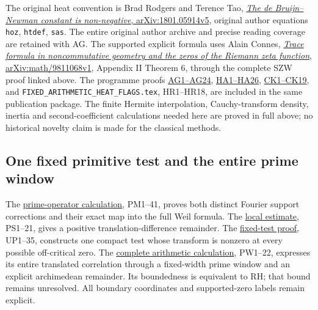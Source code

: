 \documentclass[
  10pt,
  a4paper,
]{article}
\begin{document}
The original heat convention is Brad Rodgers and Terence Tao,
\href{https://arxiv.org/abs/1801.05914v5}{\emph{The de Bruijn--Newman
constant is non-negative}, arXiv:1801.05914v5}, original author
equations \texttt{hoz}, \texttt{htdef}, \texttt{sas}. The entire
original author archive and precise reading coverage are retained with
AG. The supported explicit formula uses Alain Connes,
\href{https://arxiv.org/abs/math/9811068v1}{\emph{Trace formula in
noncommutative geometry and the zeros of the Riemann zeta function},
arXiv:math/9811068v1}, Appendix II Theorem 6, through the complete SZW
proof linked above. The programme proofs
\href{ACTUAL_HEAT_ZERO_DISTRIBUTION_VARIATION.md}{AG1--AG24},
\href{HEAT_CAUCHY_ARITHMETIC_DERIVATION.md}{HA1--HA26},
\href{CAUCHY_WEIL_POSITIVITY_CRITERION.md}{CK1--CK19}, and
\texttt{FIXED\_\allowbreak{}ARITHMETIC\_\allowbreak{}HEAT\_\allowbreak{}FLAGS.\allowbreak{}tex}, HR1--HR18, are included in
the same publication package. The finite Hermite interpolation,
Cauchy-transform density, inertia and second-coefficient calculations
needed here are proved in full above; no historical novelty claim is
made for the classical methods.

\subsection{One fixed primitive test and the entire prime
window}\label{one-fixed-primitive-test-and-the-entire-prime-window}

The \href{PRIME_PROJECTOR_MOBIUS_DERIVATION.md}{prime-operator
calculation}, PM1--41, proves both distinct Fourier support corrections
and their exact map into the full Weil formula. The
\href{PRIMITIVE_SHORT_SUPPORT_DERIVATION.md}{local estimate}, PS1--21,
gives a positive translation-difference remainder. The
\href{UNIVERSAL_PRIMITIVE_TRANSLATION_CRITERION.md}{fixed-test proof},
UP1--35, constructs one compact test whose transform is nonzero at every
possible off-critical zero. The
\href{PRIMITIVE_PRIME_WINDOW_DERIVATION.md}{complete arithmetic
calculation}, PW1--22, expresses its entire translated correlation
through a fixed-width prime window and an explicit archimedean
remainder. Its boundedness is equivalent to RH; that bound remains
unresolved. All boundary coordinates and supported-zero labels remain
explicit.
\end{document}
